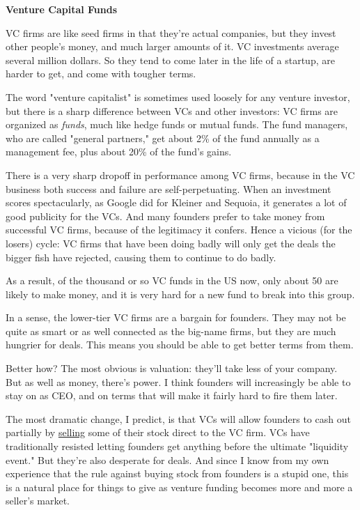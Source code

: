 \textbf{Venture Capital Funds}

VC firms are like seed firms in that they're actual companies, but
they invest other people's money, and much larger amounts of it.
VC investments average several million dollars.  So they tend to
come later in the life of a startup, are harder to get, and come
with tougher terms.

The word "venture capitalist" is sometimes used loosely for any
venture investor, but there is a sharp difference between VCs and
other investors: VC firms are organized as \emph{funds}, much like
hedge funds or mutual funds.  The fund managers, who are called
"general partners," get about 2\% of the fund annually as a management
fee, plus about 20\% of the fund's gains.

There is a very sharp dropoff in performance among VC firms, because
in the VC business both success and failure are self-perpetuating.
When an investment scores spectacularly, as Google did for Kleiner
and Sequoia, it generates a lot of good publicity for the VCs.  And
many founders prefer to take money from successful VC firms, because
of the legitimacy it confers.  Hence a vicious (for the losers)
cycle:  VC firms that have been doing badly will only get the deals
the bigger fish have rejected, causing them to continue to do badly.

As a result, of the thousand or so VC funds in the US now, only
about 50 are likely to make money, and it is very hard for a new
fund to break into this group.

In a sense, the lower-tier VC firms are a bargain for founders.
They may not be quite as smart or as well connected as the big-name
firms, but they are much hungrier for deals.  This means you should
be able to get better terms from them.

Better how?  The most obvious is valuation: they'll take less of
your company.  But as well as money, there's power.  I think founders
will increasingly be able to stay on as CEO, and on terms that will
make it fairly hard to fire them later.

The most dramatic change, I predict,
is that VCs will allow founders to 
cash out partially by \href{http://www.paulgraham.com/vcsqueeze.html}{selling}
some of their stock direct to the VC firm.  VCs have traditionally
resisted letting founders get anything before the ultimate "liquidity
event."  But they're also desperate for deals.  And since I know
from my own experience that the rule against buying stock from
founders is a stupid one, this is a natural place for things to
give as venture funding becomes more and more a seller's market.

